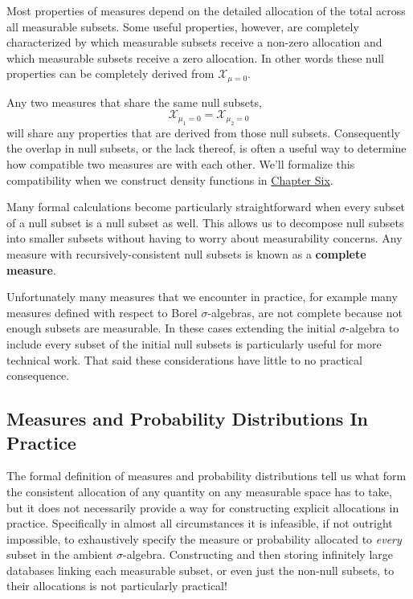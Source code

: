 \documentclass[
  letterpaper,
  DIV=11,
  numbers=noendperiod]{scrartcl}
\begin{document}
Most properties of measures depend on the detailed allocation of the
total across all measurable subsets. Some useful properties, however,
are completely characterized by which measurable subsets receive a
non-zero allocation and which measurable subsets receive a zero
allocation. In other words these null properties can be completely
derived from \(\mathcal{X}_{\mu = 0}\).

Any two measures that share the same null subsets, \[
\mathcal{X}_{\mu_{1} = 0} = \mathcal{X}_{\mu_{2} = 0}
\] will share any properties that are derived from those null subsets.
Consequently the overlap in null subsets, or the lack thereof, is often
a useful way to determine how compatible two measures are with each
other. We'll formalize this compatibility when we construct density
functions in
\href{https://betanalpha.github.io/assets/chapters_html/density_functions.html}{Chapter
Six}.

Many formal calculations become particularly straightforward when every
subset of a null subset is a null subset as well. This allows us to
decompose null subsets into smaller subsets without having to worry
about measurability concerns. Any measure with recursively-consistent
null subsets is known as a \textbf{complete measure}.

Unfortunately many measures that we encounter in practice, for example
many measures defined with respect to Borel \(\sigma\)-algebras, are not
complete because not enough subsets are measurable. In these cases
extending the initial \(\sigma\)-algebra to include every subset of the
initial null subsets is particularly useful for more technical work.
That said these considerations have little to no practical consequence.

\hypertarget{measures-and-probability-distributions-in-practice}{%
\subsection{Measures and Probability Distributions In
Practice}\label{measures-and-probability-distributions-in-practice}}

The formal definition of measures and probability distributions tell us
what form the consistent allocation of any quantity on any measurable
space has to take, but it does not necessarily provide a way for
constructing explicit allocations in practice. Specifically in almost
all circumstances it is infeasible, if not outright impossible, to
exhaustively specify the measure or probability allocated to
\emph{every} subset in the ambient \(\sigma\)-algebra. Constructing and
then storing infinitely large databases linking each measurable subset,
or even just the non-null subsets, to their allocations is not
particularly practical!
\end{document}
